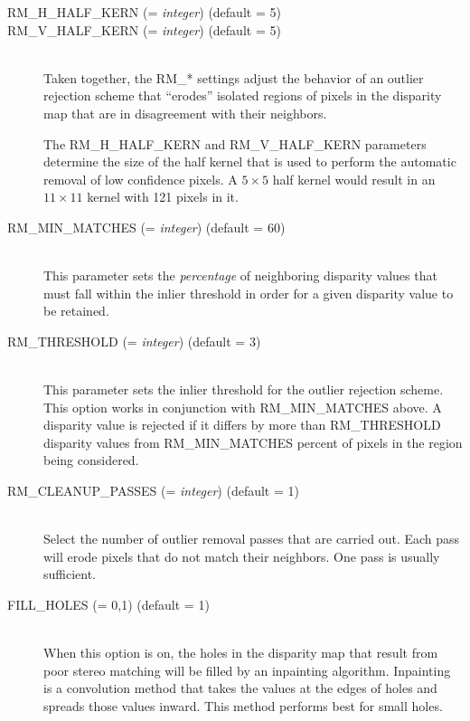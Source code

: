 \begin{description}

\item[RM\_H\_HALF\_KERN \textnormal{\small{(= \emph{integer})}} (default = 5)]
\item[RM\_V\_HALF\_KERN \textnormal{\small{(= \emph{integer})}} (default = 5)] \hfill \\
  Taken together, the RM\_* settings adjust the behavior of an outlier
  rejection scheme that ``erodes'' isolated regions of pixels in the
  disparity map that are in disagreement with their neighbors.

  The RM\_H\_HALF\_KERN and RM\_V\_HALF\_KERN parameters determine the
  size of the half kernel that is used to perform the automatic
  removal of low confidence pixels.  A $5 \times 5$ half kernel
  would result in an $11 \times 11$ kernel with 121 pixels in it.

\item[RM\_MIN\_MATCHES \textnormal{\small{(= \emph{integer})}} (default = 60)] \hfill \\
  This parameter sets the {\em percentage} of neighboring disparity
  values that must fall within the inlier threshold in order for a
  given disparity value to be retained.

\item[RM\_THRESHOLD \textnormal{\small{(= \emph{integer})}} (default = 3)] \hfill \\
  This parameter sets the inlier threshold for the outlier rejection
  scheme.  This option works in conjunction with RM\_MIN\_MATCHES
  above.  A disparity value is rejected if it differs by more than
  RM\_THRESHOLD disparity values from RM\_MIN\_MATCHES percent of
  pixels in the region being considered.

\item[RM\_CLEANUP\_PASSES \textnormal{\small{(= \emph{integer})}} (default = 1)] \hfill \\
  Select the number of outlier removal passes that are carried out.
  Each pass will erode pixels that do not match their neighbors.  One
  pass is usually sufficient.

%
\item[FILL\_HOLES \textnormal{\small{(= 0,1)}} (default = 1)] \hfill \\
  When this option is on, the holes in the disparity map that result
  from poor stereo matching will be filled by an inpainting
  algorithm. Inpainting is a convolution method that takes the values
  at the edges of holes and spreads those values inward. This method
  performs best for small holes.


\end{description}
